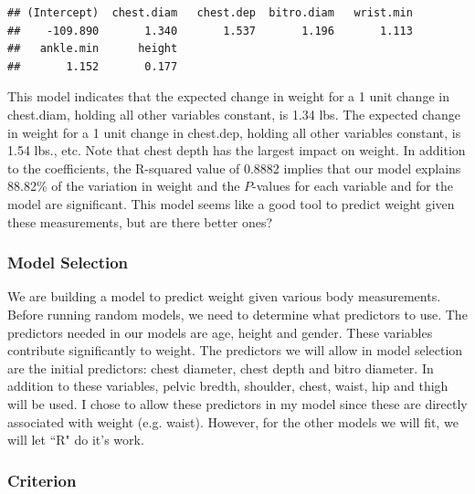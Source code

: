 \documentclass[11pt]{article}\usepackage[]{graphicx}\usepackage[]{color}
\makeatletter
\newenvironment{kframe}{%
 \def\at@end@of@kframe{}%
 \ifinner\ifhmode%
  \def\at@end@of@kframe{\end{minipage}}%
  \begin{minipage}{\columnwidth}%
 \fi\fi%
 \def\FrameCommand##1{\hskip\@totalleftmargin \hskip-\fboxsep
 \colorbox{shadecolor}{##1}\hskip-\fboxsep
     \hskip-\linewidth \hskip-\@totalleftmargin \hskip\columnwidth}%
 \MakeFramed {\advance\hsize-\width
   \@totalleftmargin\z@ \linewidth\hsize
   \@setminipage}}%
 {\par\unskip\endMakeFramed%
 \at@end@of@kframe}
\newenvironment{knitrout}{}{} %
\makeatother
\begin{document}
\begin{knitrout}
\color{fgcolor}\begin{kframe}
\begin{verbatim}
## (Intercept)  chest.diam   chest.dep  bitro.diam   wrist.min 
##    -109.890       1.340       1.537       1.196       1.113 
##   ankle.min      height 
##       1.152       0.177
\end{verbatim}
\end{kframe}
\end{knitrout}


This model indicates that the expected change in weight for a 1 unit change in chest.diam, holding all other variables constant, is 1.34 lbs. The expected change in weight for a 1 unit change in chest.dep, holding all other variables constant, is 1.54 lbs., etc. Note that chest depth has the largest impact on weight. In addition to the coefficients, the R-squared value of 0.8882 implies that our model explains 88.82\% of the variation in weight and the $P$-values for each variable and for the model are significant. This model seems like a good tool to predict weight given these measurements, but are there better ones?

\subsubsection{Model Selection}

We are building a model to predict weight given various body measurements. Before running random models, we need to determine what predictors to use. The predictors needed in our models are age, height and gender. These variables contribute significantly to weight. The predictors we will allow in model selection are the initial predictors: chest diameter, chest depth and bitro diameter. In addition to these variables, pelvic bredth, shoulder, chest, waist, hip and thigh will be used. I chose to allow these predictors in my model since these are directly associated with weight (e.g. waist). However, for the other models we will fit, we will let ``R" do it's work.

\subsubsection{Criterion}
\end{document}
